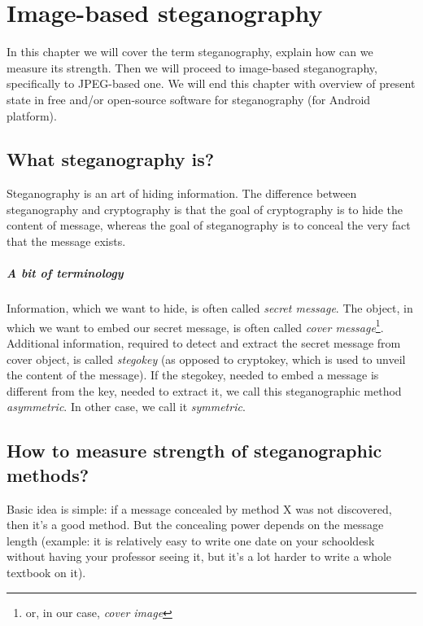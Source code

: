 \chapter{Image-based steganography}

In this chapter we will cover the term steganography, explain 
how can we measure its strength. Then we will proceed to image-based
steganography, specifically to JPEG-based one. We will end this chapter
with overview of present state in free and/or open-source software for steganography
(for Android platform).

\section{What steganography is?}

Steganography is an art of hiding information. The difference between steganography and
cryptography is that the goal of cryptography is to hide the content of message, whereas
the goal of steganography is to conceal the very fact that the message exists.

\paragraph{A bit of terminology}

Information, which we want to hide, is often called \textit{secret message}. The object,
in which we want to embed our secret message, is often called \textit{cover message}\footnote{or, in our case,
\textit{cover image}}. Additional information, required to detect and extract the secret message
from cover object, is called \textit{stegokey} (as opposed to cryptokey, which is used to 
unveil the content of the message). If the stegokey, needed to embed a message is different
from the key, needed to extract it, we call this steganographic method \textit{asymmetric}. In
other case, we call it \textit{symmetric}.

\section{How to measure strength of steganographic methods?}

Basic idea is simple: if a message concealed by method X was not discovered, then it's a good method.
But the concealing power depends on the message length (example: it is relatively easy
to write one date on your schooldesk without having your professor seeing it, but it's a lot
harder to write a whole textbook on it). 

